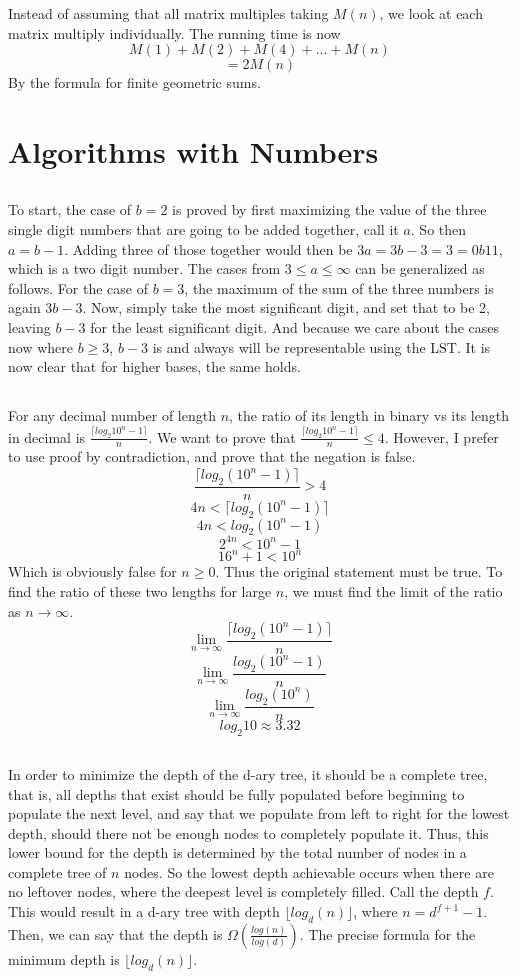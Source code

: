 \documentclass{article}
\newcommand\floor[1]{\lfloor#1\rfloor}
\newcommand\ceil[1]{\lceil#1\rceil}
\begin{document}
\subsubsection{}Instead of assuming that all matrix multiples taking $M(n)$, we look at each matrix multiply individually. The running time is now $$M(1)+M(2)+M(4)+...+M(n)$$
$$=2M(n)$$
By the formula for finite geometric sums. 
\section{Algorithms with Numbers}
\subsection{} To start, the case of $b=2$ is proved by first maximizing the value of the three single digit numbers that are going to be added together, call it $a$. So then $a=b-1$. Adding three of those together would then be $3a=3b-3=3=0b11$, which is a two digit number. The cases from $3 \leq a \leq \infty$ can be generalized as follows. For the case of $b=3$, the maximum of the sum of the three numbers is again $3b-3$. Now, simply take the most significant digit, and set that to be 2, leaving $b-3$ for the least significant digit. And because we care about the cases now where $b \geq 3$, $b-3$ is and always will be representable using the LST. It is now clear that for higher bases, the same holds. 
\subsection{} For any decimal number of length $n$, the ratio of its length in binary vs its length in decimal is $\frac{\ceil{log_2{10^n-1}}}{n}$. We want to prove that $\frac{\ceil{log_2{10^n-1}}}{n} \leq 4$. However, I prefer to use proof by contradiction, and prove that the negation is false. $$\frac{\ceil{log_2{(10^n-1)}}}{n} > 4$$
$$4n<\ceil{log_2{(10^n-1)}}$$
$$4n<log_2{(10^n-1)}$$
$$2^{4n}<10^n-1$$
$$16^n+1<10^n$$
Which is obviously false for $n \geq 0$. Thus the original statement must be true. 
To find the ratio of these two lengths for large $n$, we must find the limit of the ratio as $n \rightarrow \infty$.
$$\lim_{n \rightarrow \infty}\frac{\ceil{log_2{(10^n-1)}}}{n}$$
$$\lim_{n \rightarrow \infty}\frac{log_2{(10^n-1)}}{n}$$
$$\lim_{n \rightarrow \infty}\frac{log_2{(10^n)}}{n}$$
$$log_2{10} \approx 3.32$$
\subsection{}In order to minimize the depth of the d-ary tree, it should be a complete tree, that is, all depths that exist should be fully populated before beginning to populate the next level, and say that we populate from left to right for the lowest depth, should there not be enough nodes to completely populate it. Thus, this lower bound for the depth is determined by the total number of nodes in a complete tree of $n$ nodes. So the lowest depth achievable occurs when there are no leftover nodes, where the deepest level is completely filled. Call the depth $f$. This would result in a d-ary tree with depth $\floor{log_d(n)}$, where $n=d^{f+1}-1$. Then, we can say that the depth is $\Omega(\frac{log(n)}{log(d)})$. The precise formula for the minimum depth is $\floor{log_d(n)}$.
\end{document}
